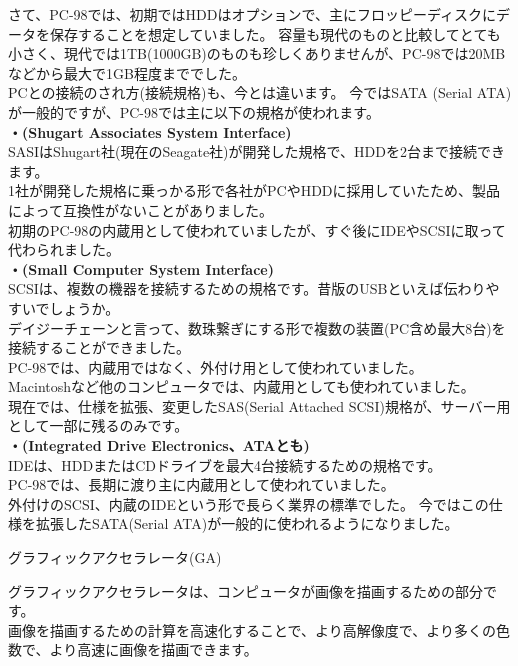 \documentclass[b5paper,9pt,platex,dvipdfmx]{jsarticle}
\begin{document}
\begin{multicols}{3}
\begin{enumerate}
  さて、PC-98では、初期ではHDDはオプションで、主にフロッピーディスクにデータを保存することを想定していました。
  容量も現代のものと比較してとても小さく、現代では1TB(1000GB)のものも珍しくありませんが、PC-98では20MBなどから最大で1GB程度まででした。\\
  PCとの接続のされ方(接続規格)も、今とは違います。
  今ではSATA (Serial ATA)が一般的ですが、PC-98では主に以下の規格が使われます。\\
  {\bf・(Shugart Associates System Interface)\\}
  SASIはShugart社(現在のSeagate社)が開発した規格で、HDDを2台まで接続できます。\\
  1社が開発した規格に乗っかる形で各社がPCやHDDに採用していたため、製品によって互換性がないことがありました。\\
  初期のPC-98の内蔵用として使われていましたが、すぐ後にIDEやSCSIに取って代わられました。\\
  {\bf・(Small Computer System Interface)\\}
  SCSIは、複数の機器を接続するための規格です。昔版のUSBといえば伝わりやすいでしょうか。\\
  デイジーチェーンと言って、数珠繋ぎにする形で複数の装置(PC含め最大8台)を接続することができました。\\
  PC-98では、内蔵用ではなく、外付け用として使われていました。\\
  Macintoshなど他のコンピュータでは、内蔵用としても使われていました。\\
  現在では、仕様を拡張、変更したSAS(Serial Attached SCSI)規格が、サーバー用として一部に残るのみです。\\
  {\bf・(Integrated Drive Electronics、ATAとも)\\}
  IDEは、HDDまたはCDドライブを最大4台接続するための規格です。\\
  PC-98では、長期に渡り主に内蔵用として使われていました。\\
  外付けのSCSI、内蔵のIDEという形で長らく業界の標準でした。
  今ではこの仕様を拡張したSATA(Serial ATA)が一般的に使われるようになりました。\\
  {\bf  \item グラフィックアクセラレータ(GA)\\}
  グラフィックアクセラレータは、コンピュータが画像を描画するための部分です。\\
  画像を描画するための計算を高速化することで、より高解像度で、より多くの色数で、より高速に画像を描画できます。\\

\end{enumerate}
\end{multicols}
\end{document}
